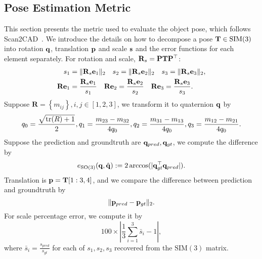 \subsection*{Pose Estimation Metric}

This section presents the metric used to evaluate the object pose, which follows Scan2CAD~\cite{avetisyan2019scan2cad}. 
We introduce the details on how to decompose a pose $\mathbf{T} \in \text{SIM}(3)$ into rotation $\mathbf{q}$, translation $\mathbf{p}$ and scale $\mathbf{s}$ and the error functions for each element separately.
For rotation and scale, $\mathbf{R}_s = \mathbf{P}\mathbf{T}\mathbf{P}^\top$:
\begin{equation}
\label{eq:pose_error}
\begin{aligned}
s_1 &= \| \mathbf{R}_s\mathbf{e}_1 \|_2 \quad 
s_2 = \| \mathbf{R}_s\mathbf{e}_2 \|_2 \quad 
s_3 = \| \mathbf{R}_s\mathbf{e}_3 \|_2, \\
\mathbf{R}\mathbf{e}_1 &= \frac{\mathbf{R}_s\mathbf{e}_1}{s_1} \quad 
\mathbf{R}\mathbf{e}_2 = \frac{\mathbf{R}_s\mathbf{e}_2}{s_2}
\quad 
\mathbf{R}\mathbf{e}_3 = \frac{\mathbf{R}_s\mathbf{e}_3}{s_3}. 
\end{aligned}
\end{equation}
Suppose $\boldsymbol{R}=\left\{m_{i j}\right\}, i, j \in[1,2,3]$, we transform it to quaternion $\mathbf{q}$ by 
\begin{equation}
\scaleMathLine[0.9]
{
\begin{aligned}
q_{0}=\frac{\sqrt{\operatorname{tr}(R)+1}}{2}, q_{1}=\frac{m_{23}-m_{32}}{4 q_{0}}, q_{2}=\frac{m_{31}-m_{13}}{4 q_{0}}, q_{3}=\frac{m_{12}-m_{21}}{4 q_{0}}. 
\end{aligned}
}
\end{equation}
Suppose the prediction and groundtruth are $\mathbf{q}_{pred}, \mathbf{q}_{gt}$, we compute the difference by 
\begin{equation}
\begin{aligned}
e_{\text{SO(3)}}(\mathbf{q},\hat{\mathbf{q}}) := 2 \arccos (| \mathbf{q}_{gt}^\top \mathbf{q}_{pred} |). 
\end{aligned}
\end{equation}
Translation is $\mathbf{p} = \mathbf{T}[1:3, 4]$, and we compare the difference between prediction and groundtruth by 
\begin{equation}
\| \mathbf{p}_{pred} - \mathbf{p}_{gt} \|_2. 
\end{equation}
For scale percentage error, we compute it by 
\begin{equation}
100\times | \frac{1}{3} \sum_{i=1}^{3} \bar{s}_i - 1 |,
\end{equation}
where $\bar{s}_i = \frac{s_{pred}}{s_{gt}}$ for each of $s_1, s_2, s_3$ recovered from the $\text{SIM}(3)$ matrix. 

